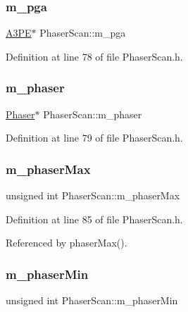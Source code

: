 \subsubsection{\texorpdfstring{m\+\_\+pga}{m\_pga}}
{\footnotesize\ttfamily \hyperlink{classA3PE}{A3\+PE}$\ast$ Phaser\+Scan\+::m\+\_\+pga\hspace{0.3cm}{\ttfamily [private]}}



Definition at line 78 of file Phaser\+Scan.\+h.

\mbox{\label{classPhaserScan_ae2726b0d199ca8ae713cea55866d4ae3}} 
\subsubsection{\texorpdfstring{m\+\_\+phaser}{m\_phaser}}
{\footnotesize\ttfamily \hyperlink{classPhaser}{Phaser}$\ast$ Phaser\+Scan\+::m\+\_\+phaser\hspace{0.3cm}{\ttfamily [private]}}



Definition at line 79 of file Phaser\+Scan.\+h.

\mbox{\label{classPhaserScan_ab47dd8cf441f9c713aa8c3e2251b382d}} 
\subsubsection{\texorpdfstring{m\+\_\+phaser\+Max}{m\_phaserMax}}
{\footnotesize\ttfamily unsigned int Phaser\+Scan\+::m\+\_\+phaser\+Max\hspace{0.3cm}{\ttfamily [private]}}



Definition at line 85 of file Phaser\+Scan.\+h.



Referenced by phaser\+Max().

\mbox{\label{classPhaserScan_a65f83dd6b9e6c62cd828ef7b094c0361}} 
\subsubsection{\texorpdfstring{m\+\_\+phaser\+Min}{m\_phaserMin}}
{\footnotesize\ttfamily unsigned int Phaser\+Scan\+::m\+\_\+phaser\+Min\hspace{0.3cm}{\ttfamily [private]}}



